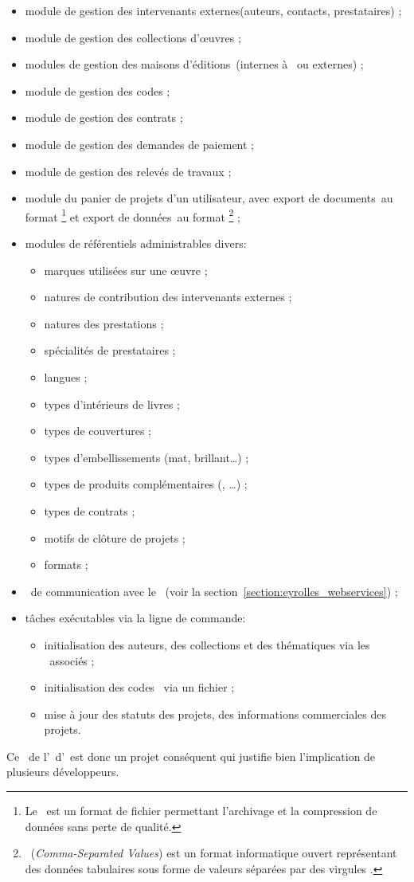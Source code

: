\begin{itemize}
\begin{itemize}
		\end{itemize}
	\item module de gestion des intervenants externes\aast (auteurs, contacts, prestataires) ;
	\item module de gestion des collections d'œuvres ;
	\item modules de gestion des maisons d'éditions\aast\ (internes à \aey\ ou externes) ;
	\item module de gestion des codes \ageodif\aast ;
	\item module de gestion des contrats ;
	\item module de gestion des demandes de paiement ;
	\item module de gestion des relevés de travaux ;
	\item module du panier de projets d'un utilisateur\aast, avec export de documents\aast\ au format \azip\footnote{Le \azip\ est un format de fichier permettant l'archivage et la compression de données sans perte de qualité.\cite{zip}} et export de données\aast\ au format \acsv\footnote{\acsv\ (\textit{Comma-Separated Values}) est un format informatique ouvert  représentant des données tabulaires sous forme de \og valeurs séparées par des virgules \fg.\cite{csv}} ;
	\item modules de référentiels administrables divers\aast :
		\begin{itemize}
			\item marques utilisées sur une œuvre ;
			\item natures de contribution des intervenants externes ;
			\item natures des prestations ;
			\item spécialités de prestataires ;
			\item langues ;
			\item types d'intérieurs de livres ;
			\item types de couvertures ;
			\item types d'embellissements (mat, brillant\dots) ;
			\item types de produits complémentaires (\acd, \advd\dots) ;
			\item types de contrats ;
			\item motifs de clôture de projets ;
			\item formats \aebook ;
		\end{itemize}
	\item \aws\ de communication avec le \alotun\aast\ (voir la section~\ref{section:eyrolles_webservices}) ;
	\item tâches exécutables via la ligne de commande\aast :
		\begin{itemize}
			\item initialisation des auteurs, des collections et des thématiques via les \awss\ associés ;
			\item initialisation des codes \ageodif\ via un fichier \acsv ;
			\item mise à jour des statuts des projets, des informations commerciales des projets.
		\end{itemize}
\end{itemize}

Ce \alotdeux\ de l'\aintranet\ d'\aey\ est donc un projet conséquent qui justifie bien l'implication de plusieurs développeurs.

